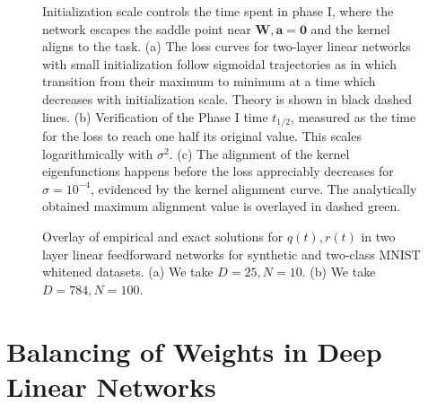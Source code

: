 \documentclass{article} %
\begin{document}
\begin{appendix}
\begin{figure}
    \centering
    
    \caption{Initialization scale controls the time spent in phase I, where the network escapes the saddle point near $\bm W, \bm a= \bm 0$ and the kernel aligns to the task. (a) The loss curves for two-layer linear networks with small initialization follow sigmoidal trajectories as in \cite{Saxe14exactsolutions} which transition from their maximum to minimum at a time which decreases with initialization scale. Theory is shown in black dashed lines. (b) Verification of the Phase I time $t_{1/2}$, measured as the time for the loss to reach one half its original value. This scales logarithmically with $\sigma^{2}$. (c) The alignment of the kernel eigenfunctions happens before the loss appreciably decreases for $\sigma = 10^{-4}$, evidenced by the kernel alignment curve. The analytically obtained maximum alignment value is overlayed in dashed green.}
    \label{fig:two_layer_theory_expt}
\end{figure}

\begin{figure}[h]
    \centering
    \caption{Overlay of empirical and exact solutions for $q(t), r(t)$ in two layer linear feedforward networks for synthetic and two-class MNIST whitened datasets. (a) We take $D=25, N=10$.  (b) We take $D=784, N=100$.}
    \label{fig:qr}
\end{figure}

\section{Balancing of Weights in Deep Linear Networks}\label{app:other_loss_fns}


\end{appendix}
\end{document}
